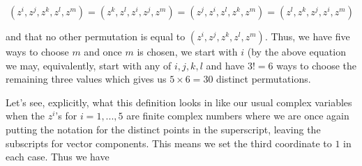 \documentclass{amsart}
\theoremstyle{theorem}
\theoremstyle{lemma}
\theoremstyle{definition}
\begin{document}
$$(z^i, z^j, z^k , z^l, z^m )=(z^k, z^l, z^i , z^j, z^m )=(z^j, z^i, z^l , z^k, z^m)=(z^l, z^k, z^j , z^i, z^m)$$

\noindent and that no other permutation is equal to $(z^i, z^j, z^k , z^l, z^m )$. Thus, we have five ways to choose $m$ and once $m$ is chosen, we start with $i$ (by the above equation we may, equivalently, start with any of $i,j,k,l$ and have $3!=6$ ways to choose the remaining three values which gives us $5 \times 6=30$ distinct permutations. 

Let's see, explicitly, what this definition looks in like our usual complex variables when the $z^i$'s for $i=1,...,5$ are finite complex numbers where we are once again putting the notation for the distinct points in the superscript, leaving the subscripts for vector components. This means we set the third coordinate to $1$ in each case. Thus we have
\end{document}
